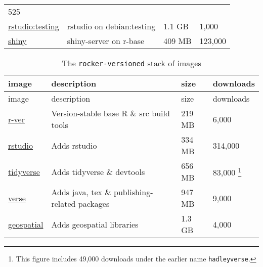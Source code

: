 \begin{longtable}[]{@{}llll@{}}
\begin{minipage}[t]{0.10\columnwidth}
525\strut
\end{minipage}\tabularnewline
\begin{minipage}[t]{0.20\columnwidth}\raggedright\strut
\href{https://hub.docker.com/r/rocker/r-devel-san}{rstudio:testing}\strut
\end{minipage} & \begin{minipage}[t]{0.50\columnwidth}\raggedright\strut
rstudio on debian:testing\strut
\end{minipage} & \begin{minipage}[t]{0.08\columnwidth}\raggedright\strut
1.1 GB\strut
\end{minipage} & \begin{minipage}[t]{0.10\columnwidth}\raggedright\strut
1,000\strut
\end{minipage}\tabularnewline
\begin{minipage}[t]{0.20\columnwidth}\raggedright\strut
\href{https://hub.docker.com/r/rocker/shiny}{shiny}\strut
\end{minipage} & \begin{minipage}[t]{0.50\columnwidth}\raggedright\strut
shiny-server on r-base\strut
\end{minipage} & \begin{minipage}[t]{0.08\columnwidth}\raggedright\strut
409 MB\strut
\end{minipage} & \begin{minipage}[t]{0.10\columnwidth}\raggedright\strut
123,000\strut
\end{minipage}\tabularnewline
\bottomrule
\end{longtable}

\begin{longtable}[]{@{}llll@{}}
\caption{The \texttt{rocker-versioned} stack of images}\tabularnewline
\toprule
image & description & size & downloads\tabularnewline
\midrule
\endfirsthead
\toprule
image & description & size & downloads\tabularnewline
\midrule
\endhead
\href{https://hub.docker.com/r/rocker/r-ver}{r-ver} & Version-stable
base R \& src build tools & 219 MB & 6,000\tabularnewline
\href{https://hub.docker.com/r/rocker/rstudio}{rstudio} & Adds rstudio &
334 MB & 314,000\tabularnewline
\href{https://hub.docker.com/r/rocker/tidyverse}{tidyverse} & Adds
tidyverse \& devtools & 656 MB & 83,000 \footnote{This figure includes
  49,000 downloads under the earlier name \texttt{hadleyverse}.}\tabularnewline
\href{https://hub.docker.com/r/rocker/verse}{verse} & Adds java, tex \&
publishing-related packages & 947 MB & 9,000\tabularnewline
\href{https://hub.docker.com/r/rocker/geospatial}{geospatial} & Adds
geospatial libraries & 1.3 GB & 4,000\tabularnewline
\bottomrule
\end{longtable}


